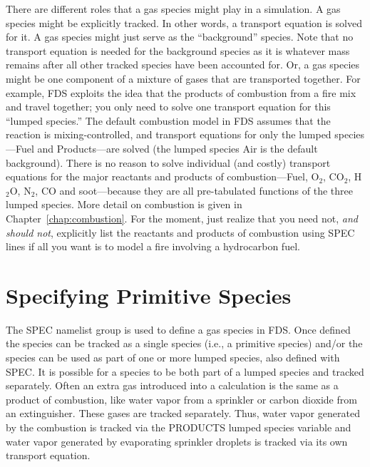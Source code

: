 \documentclass[11pt]{book}
\begin{document}
There are different roles that a gas species might play in a simulation. A gas species might be explicitly tracked. In other words, a transport equation is solved for it. A gas species might just serve as the ``background'' species.  Note that no transport equation is needed for the background species as it is whatever mass remains after all other tracked species have been accounted for. Or, a gas species might be one component of a mixture of gases that are transported together. For example, FDS exploits the idea that the products of combustion from a fire mix and travel together; you only need to solve one transport equation for this ``lumped species.'' The default combustion model in FDS assumes that the reaction is mixing-controlled, and transport equations for only the lumped species---Fuel and Products---are solved (the lumped species Air is the default background).  There is no reason to solve individual (and costly) transport equations for the major reactants and products of combustion---Fuel, O$_2$, CO$_2$, H$_2$O, N$_2$, CO and soot---because they are all pre-tabulated functions of the three lumped species. More detail on combustion is given in Chapter~\ref{chap:combustion}. For the moment, just realize that you need not, {\em and should not}, explicitly list the reactants and products of combustion using {\ct SPEC} lines if all you want is to model a fire involving a hydrocarbon fuel.



\section{Specifying Primitive Species}
\label{info:primitive}

The {\ct SPEC} namelist group is used to define a gas species in FDS. Once defined the species can be tracked as a single species (i.e., a primitive species) and/or the species can be used as part of one or more lumped species, also defined with {\ct SPEC}.  It is possible for a species to be both part of a lumped species and tracked separately. Often an extra gas introduced into a calculation is the same as a product of combustion, like water vapor from a sprinkler or carbon dioxide from an extinguisher. These gases are tracked separately. Thus, water vapor generated by the combustion is tracked via the {\ct PRODUCTS} lumped species variable and water vapor generated by evaporating sprinkler droplets is tracked via its own transport equation.
\end{document}
